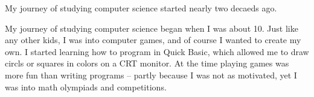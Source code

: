 
My journey of studying computer science started nearly two decaeds ago.



My journey of studying computer science began when I was about 10.
Just like any other kids, I was into computer games, and of course I wanted to create my own. 
I started learning how to program in Quick Basic, which allowed me to draw circls or squares in colors on a CRT monitor.
At the time playing games was more fun than writing programs -- partly because I was not as motivated, yet I was into math olympiads and competitions.


